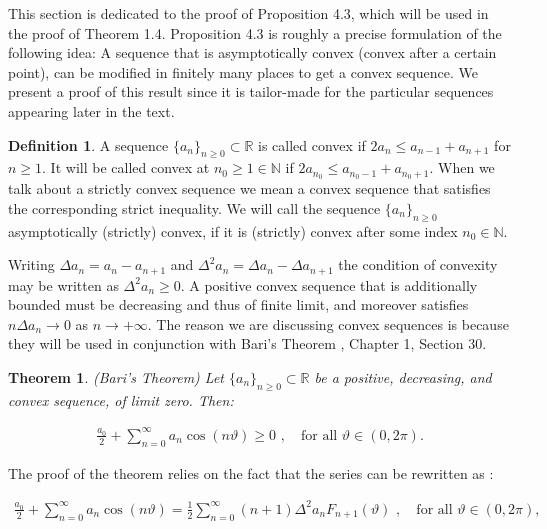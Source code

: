 \documentclass{amsart}[11pt]
\newcommand{\R}{\mathbb{R}} %
\newcommand{\N}{\mathbb{N}} %
\newcommand{\sbs}{\subset} %
\newcommand{\vth}{\vartheta}
\newcommand{\ra}{\rightarrow}
\newtheorem{theorem}{Theorem}[section]
\theoremstyle{definition}
\newtheorem{definition}{Definition}
\begin{document}
This section is dedicated to the proof of Proposition 4.3, which will be used in the proof of Theorem 1.4. Proposition 4.3 is roughly a precise formulation of the following idea: A sequence that is asymptotically convex (convex after a certain point), can be modified in finitely many places to get a convex sequence. We present a proof of this result since it is tailor-made for the particular sequences appearing later in the text.


\begin{definition}
A sequence $\{a_n\}_{n \geq 0} \sbs \R$ is called convex if $2a_n \leq a_{n-1} + a_{n+1}$ for $n \geq 1$. It will be called convex at $n_0 \geq 1 \in \N$ if $2a_{n_0} \leq a_{n_0-1} + a_{n_0+1}$. When we talk about a strictly convex sequence we mean a convex sequence that satisfies the corresponding strict inequality. We will call the sequence $\{a_n\}_{n \geq 0}$ asymptotically (strictly) convex, if it is (strictly) convex after some index $n_0 \in \N$.
\end{definition}

Writing $\Delta a_n = a_n - a_{n+1}$ and $\Delta^2 a_n = \Delta a_n - \Delta a_{n+1}$ the condition of convexity may be written as $\Delta^2 a_n \geq 0$. A positive convex sequence that is additionally bounded must be decreasing and thus of finite limit, and moreover satisfies $n \Delta a_n \ra 0$ as $n \ra + \infty$. The reason we are discussing convex sequences is because they will be used in conjunction with Bari's Theorem \cite{Bary2014}, Chapter 1, Section 30.

\begin{theorem}{(Bari's Theorem)}
  Let $\{a_n\}_{n\geq 0} \sbs \R$ be a positive, decreasing, and convex sequence, of limit zero. Then:

  \begin{gather*}
      \frac{a_0}{2} + \sum_{n=0}^{\infty} a_n \cos(n \vth) \geq 0 \,\, , \quad \text{for all} \,\, \vth \in (0, 2\pi).
  \end{gather*}
\end{theorem}

The proof of the theorem relies on the fact that the series can be rewritten as :

\begin{gather*}
    \frac{a_0}{2} + \sum_{n=0}^{\infty} a_n \cos(n \vth) = \frac{1}{2}\sum_{n=0}^{\infty} (n+1) \Delta^2 a_n F_{n+1}(\vth) \,\, , \quad \text{for all} \,\, \vth \in (0, 2\pi), 
\end{gather*}
\end{document}
